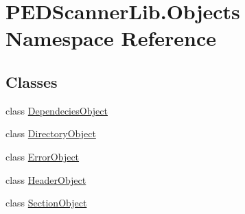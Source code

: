 \hypertarget{namespace_p_e_d_scanner_lib_1_1_objects}{}\section{P\+E\+D\+Scanner\+Lib.\+Objects Namespace Reference}
\label{namespace_p_e_d_scanner_lib_1_1_objects}
\subsection*{Classes}
\begin{DoxyCompactItemize}
\item 
class \mbox{\hyperlink{class_p_e_d_scanner_lib_1_1_objects_1_1_dependecies_object}{Dependecies\+Object}}
\item 
class \mbox{\hyperlink{class_p_e_d_scanner_lib_1_1_objects_1_1_directory_object}{Directory\+Object}}
\item 
class \mbox{\hyperlink{class_p_e_d_scanner_lib_1_1_objects_1_1_error_object}{Error\+Object}}
\item 
class \mbox{\hyperlink{class_p_e_d_scanner_lib_1_1_objects_1_1_header_object}{Header\+Object}}
\item 
class \mbox{\hyperlink{class_p_e_d_scanner_lib_1_1_objects_1_1_section_object}{Section\+Object}}
\end{DoxyCompactItemize}
